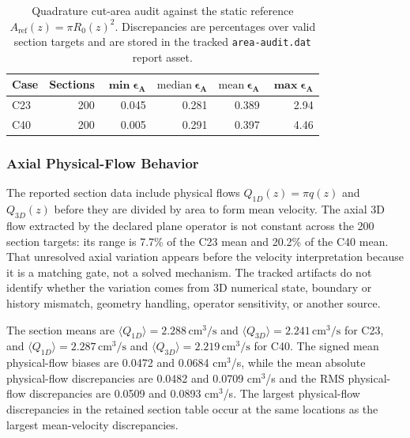 \begin{table}[!htb]
    \centering
    \scriptsize
    \caption{Quadrature cut-area audit against the static reference
    $A_{\mathrm{ref}}(z)=\pi R_0(z)^2$. Discrepancies are percentages over
    valid section targets and are stored in the tracked
    \texttt{area-audit.dat} report asset.}
    \label{tab:t1-area-audit}
    \begin{tabular}{@{}lrrrrr@{}}
        \toprule
        \textbf{Case}
            & \textbf{Sections}
            & $\boldsymbol{\min \epsilon_A}$
            & $\boldsymbol{\mathrm{median}\ \epsilon_A}$
            & $\boldsymbol{\mathrm{mean}\ \epsilon_A}$
            & $\boldsymbol{\max \epsilon_A}$ \\
        \midrule
        C23 & 200 & 0.045 & 0.281 & 0.389 & 2.94 \\
        C40 & 200 & 0.005 & 0.291 & 0.397 & 4.46 \\
        \bottomrule
    \end{tabular}
\end{table}

\subsubsection{Axial Physical-Flow Behavior}
\label{subsec:axial-flow-behavior}

The reported section data include physical flows $Q_{1D}(z)=\pi q(z)$ and
$Q_{3D}(z)$ before they are divided by area to form mean velocity. The axial 3D
flow extracted by the declared plane operator is not constant across the 200
section targets: its range is 7.7\% of the C23 mean and 20.2\% of the C40 mean.
That unresolved axial variation appears before the velocity interpretation
because it is a matching gate, not a solved mechanism. The tracked artifacts do
not identify whether the variation comes from 3D numerical state, boundary or
history mismatch, geometry handling, operator sensitivity, or another source.

The section means are
$\langle Q_{1D}\rangle=2.288\,\mathrm{cm}^3/\mathrm{s}$ and
$\langle Q_{3D}\rangle=2.241\,\mathrm{cm}^3/\mathrm{s}$ for C23, and
$\langle Q_{1D}\rangle=2.287\,\mathrm{cm}^3/\mathrm{s}$ and
$\langle Q_{3D}\rangle=2.219\,\mathrm{cm}^3/\mathrm{s}$ for C40. The signed mean
physical-flow biases are 0.0472 and 0.0684 cm$^3$/s, while the mean absolute
physical-flow discrepancies are 0.0482 and 0.0709 cm$^3$/s and the RMS
physical-flow discrepancies are 0.0509 and 0.0893 cm$^3$/s. The largest
physical-flow discrepancies in the retained section table occur at the same
locations as the largest mean-velocity discrepancies.

